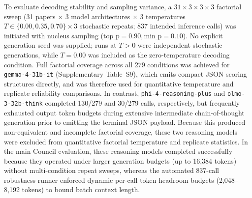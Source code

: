 \documentclass[12pt]{article}
\begin{document}
To evaluate decoding stability and sampling variance, a $31 \times 3 \times 3 \times 3$ factorial sweep (31 papers $\times$ 3 model architectures $\times$ 3 temperatures $T \in \{0.00, 0.35, 0.70\} \times 3$ stochastic repeats; 837 intended inference calls) was initiated with nucleus sampling ($\text{top\_p} = 0.90, \text{min\_p} = 0.10$). No explicit generation seed was supplied; runs at $T > 0$ were independent stochastic generations, while $T=0.00$ was included as the zero-temperature decoding condition. Full factorial coverage across all 279 conditions was achieved for \texttt{gemma-4-31b-it} (Supplementary Table~S9), which emits compact JSON scoring structures directly, and was therefore used for quantitative temperature and replicate reliability comparisons. In contrast, \texttt{phi-4-reasoning-plus} and \texttt{olmo-3-32b-think} completed 130/279 and 30/279 calls, respectively, but frequently exhausted output token budgets during extensive intermediate chain-of-thought generation prior to emitting the terminal JSON payload. Because this produced non-equivalent and incomplete factorial coverage, these two reasoning models were excluded from quantitative factorial temperature and replicate statistics. In the main Council evaluation, these reasoning models completed successfully because they operated under larger generation budgets (up to 16,384 tokens) without multi-condition repeat sweeps, whereas the automated 837-call robustness runner enforced dynamic per-call token headroom budgets (2,048--8,192 tokens) to bound batch context length.
\end{document}
